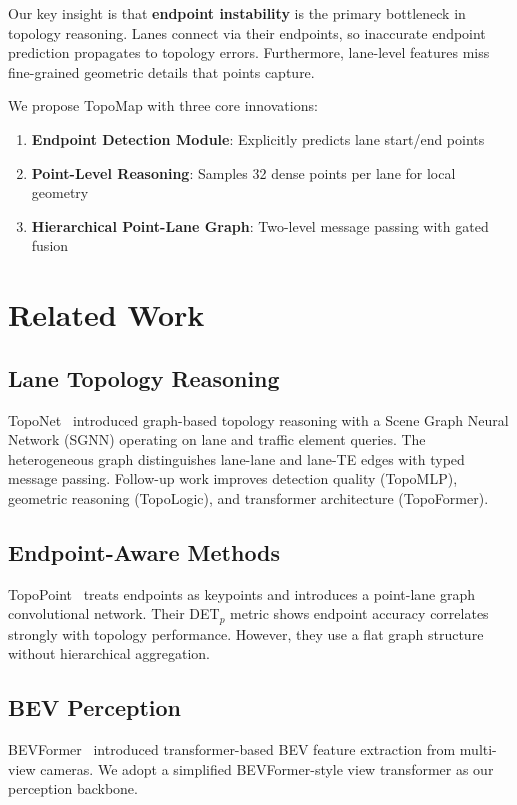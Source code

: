 \documentclass[conference, a4paper, 10pt]{IEEEtran}
\begin{document}
Our key insight is that \textbf{endpoint instability} is the primary bottleneck in topology reasoning. 
Lanes connect via their endpoints, so inaccurate endpoint prediction propagates to topology errors. 
Furthermore, lane-level features miss fine-grained geometric details that points capture.

We propose TopoMap with three core innovations:

\begin{enumerate}
    \item \textbf{Endpoint Detection Module}: Explicitly predicts lane start/end points
    \item \textbf{Point-Level Reasoning}: Samples 32 dense points per lane for local geometry
    \item \textbf{Hierarchical Point-Lane Graph}: Two-level message passing with gated fusion
\end{enumerate}

\section{Related Work}

\subsection{Lane Topology Reasoning}
TopoNet~\cite{toponet} introduced graph-based topology reasoning with a Scene Graph Neural Network (SGNN) operating on lane and traffic element queries. 
The heterogeneous graph distinguishes lane-lane and lane-TE edges with typed message passing. 
Follow-up work improves detection quality (TopoMLP), geometric reasoning (TopoLogic), and transformer architecture (TopoFormer).

\subsection{Endpoint-Aware Methods}
TopoPoint~\cite{topopoint} treats endpoints as keypoints and introduces a point-lane graph convolutional network. 
Their DET$_p$ metric shows endpoint accuracy correlates strongly with topology performance. 
However, they use a flat graph structure without hierarchical aggregation.

\subsection{BEV Perception}
BEVFormer~\cite{bevformer} introduced transformer-based BEV feature extraction from multi-view cameras. 
We adopt a simplified BEVFormer-style view transformer as our perception backbone.
\end{document}
